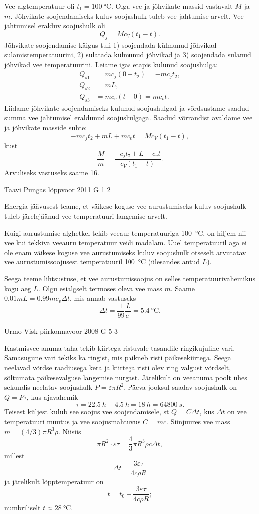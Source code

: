 \documentclass[11pt, twoside]{article}
\begin{document}
{{\ifSolution
Vee algtemperatuur oli $t_1=\SI{100}{\celsius}$. Olgu vee ja jõhvikate massid vastavalt $M$ ja $m$. Jõhvikate soojendamiseks kuluv soojushulk tuleb vee jahtumise arvelt. Vee jahtumisel eralduv soojushulk oli
\[
Q_j=Mc_V(t_1-t).
\]
Jõhvikate soojendamise käigus tuli 1) soojendada külmunud jõhvikad sulamistemperatuurini, 2) sulatada külmunud jõhvikad ja 3) soojendada sulanud jõhvikad vee temperatuurini.
Leiame igas etapis kulunud soojushulga:
\[
\begin{aligned}
Q_{s1}&=mc_j(0-t_2)=-mc_jt_2,\\
Q_{s2}&=mL,\\
Q_{s3}&=mc_v(t-0)=mc_vt.
\end{aligned}
\]
Liidame jõhvikate soojendamiseks kulunud soojushulgad ja võrdsustame saadud summa vee jahtumisel eraldunud soojushulgaga. Saadud võrrandist avaldame vee ja jõhvikate masside suhte:
\[
-mc_jt_2+mL+mc_vt=Mc_V(t_1-t),
\]
kust
\[
\frac{M}{m}=\frac{-c_jt_2+L+c_vt}{c_V(t_1-t)}.
\]
Arvuliseks vastuseks saame \num{16}.
\fi
}

{Taavi Pungas} %
{lõppvoor} %
{2011} %
{G 1} %
{2} %
{

\ifSolution
Energia jäävusest teame, et väikese koguse vee aurustumiseks kuluv soojushulk tuleb järelejäänud vee temperatuuri langemise arvelt.

Kuigi aurustumise alghetkel tekib veeaur temperatuuriga \SI{100}{\celsius}, on hiljem nii vee
kui tekkiva veeauru temperatuur veidi madalam. Uuel temperatuuril aga ei ole enam
väikese koguse vee aurustumiseks kuluv soojushulk otseselt arvutatav vee aurustumissoojusest temperatuuril \SI{100}{\celsius} (ülesandes antud $L$).

Seega teeme lihtsustuse, et vee aurustumissoojus on selles temperatuurivahemikus kogu aeg $L$. Olgu esialgselt termoses oleva vee mass $m$. Saame $\num{0,01}mL = \num{0,99}mc_v\Delta t$, mis annab vastuseks
\[
\Delta t=\frac{1}{99} \frac{L}{c_{v}}=\SI{5,4}{\celsius}.
\]
\fi
}

{Urmo Visk} %
{piirkonnavoor} %
{2008} %
{G 5} %
{3} %
{

\ifSolution
Kastmisvee anuma taha tekib kiirtega ristuvale tasandile ringikujuline vari. Samasugune vari tekiks ka ringist, mis paikneb risti päikesekiirtega. Seega neelavad võrdse raadiusega kera ja kiirtega risti olev ring valgust võrdselt, sõltumata päikesevalguse langemise nurgast. Järelikult on veeanuma poolt ühes sekundis neelatav soojushulk $P = \varepsilon \pi R^2$. Päeva jooksul saadav soojushulk on $Q = P \tau$, kus ajavahemik
\[
\tau = \SI{22,5}{h} - \SI{4,5}{h} = \SI{18}{h} = \SI{64800}{s}.
\]
Teisest küljest kulub see soojus vee soojendamisele, st $Q = C\Delta t$, kus $\Delta t$ on vee temperatuuri muutus ja vee soojusmahtuvus $C = mc$. Siinjuures vee mass $m = (4/3) \pi R^3\rho$. Niisiis 
\[
\pi R^2 \cdot \varepsilon \tau = \frac 43 \pi R^3\rho c\Delta t,
\]
millest
\[
\Delta t = \frac{3\varepsilon \tau}{4c\rho R}
\]
ja järelikult lõpptemperatuur on
\[
t = t_0 + \frac{3\varepsilon \tau}{4c\rho R};
\]
numbriliselt $t \approx \SI{28}{\celsius}$.
\fi
}

}
\end{document}
